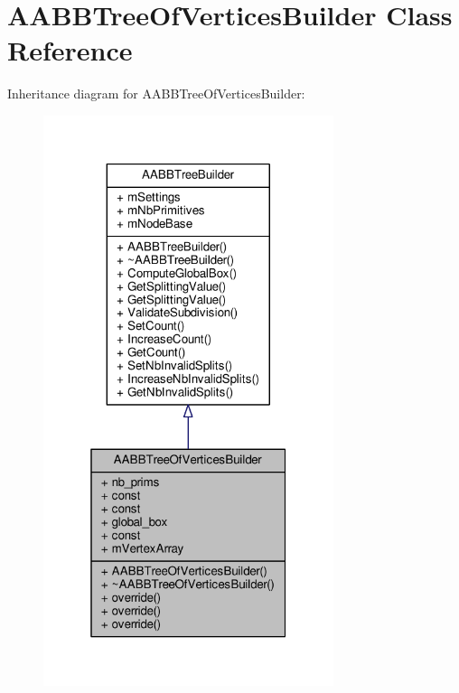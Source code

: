 \hypertarget{classAABBTreeOfVerticesBuilder}{}\section{A\+A\+B\+B\+Tree\+Of\+Vertices\+Builder Class Reference}
\label{classAABBTreeOfVerticesBuilder}


Inheritance diagram for A\+A\+B\+B\+Tree\+Of\+Vertices\+Builder\+:
\nopagebreak
\begin{figure}[H]
\begin{center}
\leavevmode
\includegraphics[width=241pt]{d0/d60/classAABBTreeOfVerticesBuilder__inherit__graph}
\end{center}
\end{figure}


